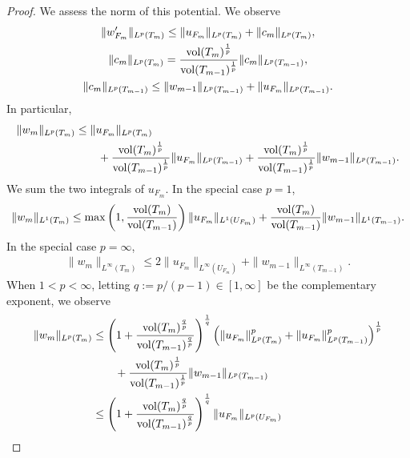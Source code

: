 \documentclass[10pt,letterpaper]{article}
\begin{document}
\begin{proof}
 We assess the norm of this potential. We observe 
 \begin{gather*}
    \| w'_{F_m} \|_{L^{p}(T_m)}
    \leq 
    \| u_{F_m} \|_{L^{p}(T_m)}
    +
    \| c_{m} \|_{L^{p}(T_m)},
    \\
    \| c_{m} \|_{L^{p}(T_m)}
    = 
    \frac{ \operatorname{vol}(T_m)^{\frac 1 p} }{ \operatorname{vol}(T_{{m-1}})^{\frac 1 p} }
    \| c_{m} \|_{L^{p}(T_{{m-1}})},
    \\ 
    \| c_{m} \|_{L^{p}(T_{{m-1}})}
    \leq 
    \| w_{m-1}\|_{L^{p}(T_{{m-1}})} + \| u_{F_{m}} \|_{L^{p}(T_{{m-1}})} 
    .
 \end{gather*}
 In particular,
 \begin{align*}
    \| w_{m} \|_{L^{p}(T_m)}
    &
    \leq 
    \| u_{F_m} \|_{L^{p}(T_m)}
    \\&\qquad 
    +
    \frac{ \operatorname{vol}(T_m)^{\frac 1 p} }{ \operatorname{vol}(T_{{m-1}})^{\frac 1 p} }
    \| u_{F_{m}} \|_{L^{p}(T_{{m-1}})}
    +
    \frac{ \operatorname{vol}(T_m)^{\frac 1 p} }{ \operatorname{vol}(T_{{m-1}})^{\frac 1 p} }
    \| w_{m-1}\|_{L^{p}(T_{{m-1}})}
    .
 \end{align*}
 We sum the two integrals of $u_{F_m}$. 
 In the special case $p=1$,
 \begin{align*}
    \| w_{m} \|_{L^{1}(T_m)}
    \leq 
    \max\left(
        1, \frac{ \operatorname{vol}(T_m) }{ \operatorname{vol}(T_{{m-1}}) } 
    \right)
    \| u_{F_m} \|_{L^{1}(U_{F_m})}
    +
    \frac{ \operatorname{vol}(T_m) }{ \operatorname{vol}(T_{{m-1}}) }
    \| w_{m-1}\|_{L^{1}(T_{{m-1}})}
    .
 \end{align*}
 In the special case $p=\infty$, 
 \begin{align*}
    \| w_{m} \|_{L^{\infty}(T_m)}
    \leq 
    2
    \| u_{F_m} \|_{L^{\infty}(U_{F_m})}
    +
    \| w_{m-1}\|_{L^{\infty}(T_{{m-1}})}
    .
 \end{align*}
 When $1 < p < \infty$, letting $q := p/(p-1) \in [1,\infty]$ be the complementary exponent, we observe 
 \begin{align*}
    \| w_{m} \|_{L^{p}(T_m)}
    &\leq 
    \left( 1 + \frac{ \vol(T_m)^{\frac q p} }{ \vol(T_{{m-1}})^{\frac q p} } \right)^{\frac 1 q}
    \left( 
        \| u_{F_m} \|_{L^{p}(T_m)}^{p}
        +
        \| u_{F_{m}} \|_{L^{p}(T_{{m-1}})}^{p}
    \right)^{\frac 1 p}
    \\&\qquad 
    +
    \frac{ \vol(T_m)^{\frac 1 p} }{ \vol(T_{{m-1}})^{\frac 1 p} }
    \| w_{m-1}\|_{L^{p}(T_{{m-1}})}
    \\&\leq 
    \left( 1 + \frac{ \vol(T_m)^{\frac q p} }{ \vol(T_{{m-1}})^{\frac q p} } \right)^{\frac 1 q}
    \| u_{F_m} \|_{L^{p}(U_{F_m})} 

\end{align*}
\end{proof}
\end{document}

